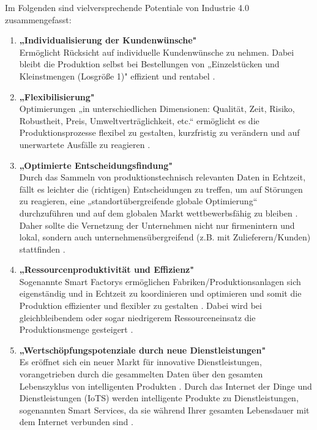 \newline
Im Folgenden sind vielversprechende Potentiale von Industrie 4.0 zusammengefasst:
\begin{enumerate}
	\item \textbf{„Individualisierung der Kundenwünsche"} \cite[S.19]{12} \\
	Ermöglicht Rücksicht auf individuelle Kundenwünsche zu nehmen. Dabei bleibt die 
	Produktion selbst bei Bestellungen von „Einzelstücken und Kleinstmengen (Losgröße 1)" \cite[S.19]{12} effizient und rentabel \cite[S.19]{12}.
	\item \textbf{„Flexibilisierung"} \cite[S.20]{12} \\
	Optimierungen „in unterschiedlichen Dimensionen: Qualität, Zeit, Risiko, Robustheit, Preis,
	Umweltverträglichkeit, etc.“ ermöglicht es die Produktionsprozesse flexibel zu gestalten,
	kurzfristig zu verändern und auf unerwartete Ausfälle zu reagieren \cite[S.20]{12}.
	\item \textbf{„Optimierte Entscheidungsfindung"} \cite[S.20]{12} \\
	Durch das Sammeln von produktionstechnisch relevanten Daten in Echtzeit, fällt es leichter
	die (richtigen) Entscheidungen zu treffen, um auf Störungen zu reagieren, eine
	„standortübergreifende globale Optimierung“ \cite[S.20]{12} durchzuführen und auf dem globalen Markt wettbewerbsfähig zu bleiben \cite[S.20]{12}. Daher sollte die Vernetzung der 
	Unternehmen nicht nur firmenintern und lokal, sondern auch unternehmensübergreifend (z.B. mit Zulieferern/Kunden) stattfinden \cite{6}.
	\item \textbf{„Ressourcenproduktivität und Effizienz"} \cite[S.20]{12} \\
	Sogenannte Smart Factorys ermöglichen Fabriken/Produktionsanlagen sich eigenständig und in Echtzeit zu koordinieren und optimieren und somit die Produktion effizienter und flexibler zu gestalten \cite{6}. Dabei wird bei gleichbleibendem oder sogar niedrigerem Ressourceneinsatz die Produktionsmenge gesteigert \cite[S.20]{12}.
	\item \textbf{„Wertschöpfungspotenziale durch neue Dienstleistungen"} \cite[S.20]{12} \\
	Es eröffnet sich ein neuer Markt für innovative Dienstleistungen, vorangetrieben durch die
	gesammelten Daten über den gesamten Lebenszyklus von intelligenten Produkten 
	\cite[S.20]{12}. Durch das Internet der Dinge und Dienstleistungen (IoTS) werden intelligente Produkte zu Dienstleistungen, sogenannten Smart Services, da sie während Ihrer gesamten Lebensdauer mit dem Internet verbunden sind \cite{6}.

\end{enumerate}
